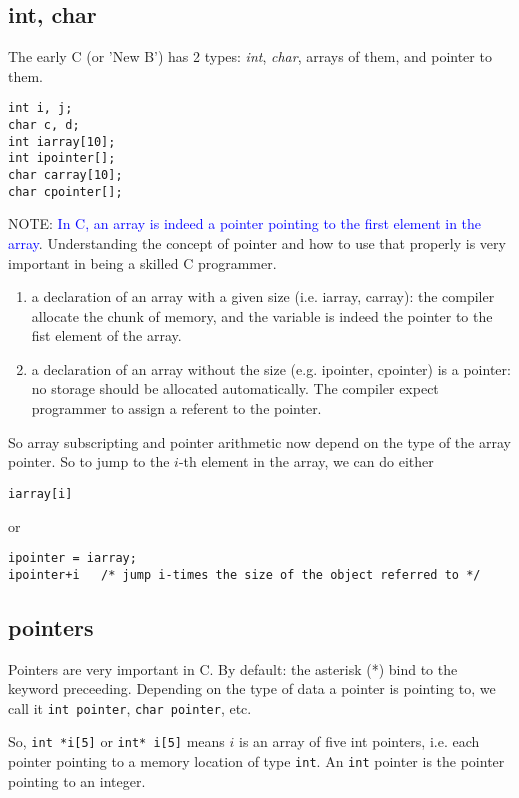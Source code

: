 \subsection{int, char}

The early C (or 'New B') has 2 types: {\it int}, {\it char}, arrays of them, and
pointer to them.
\begin{lstlisting}
int i, j;
char c, d;
int iarray[10];
int ipointer[];
char carray[10];
char cpointer[];
\end{lstlisting}
NOTE: \textcolor{blue}{In C, an array is indeed a pointer pointing to the first
element in the array}. Understanding the concept of pointer and how to use that
properly is very important in being a skilled C programmer.

\begin{enumerate}
  \item a declaration of an array with a given size (i.e. iarray, carray): the
  compiler allocate the chunk of memory, and the variable is indeed the pointer to the fist element of
  the array.
  \item a declaration of an array without the size (e.g. ipointer, cpointer) is
  a pointer: no storage should be allocated automatically. The compiler expect
  programmer to assign a referent to the pointer.
\end{enumerate}
So array subscripting and pointer arithmetic now depend on the type of the array
pointer. So to jump to the $i$-th element in the array, we can do either
\begin{lstlisting}
iarray[i]
\end{lstlisting}
or
\begin{lstlisting}
ipointer = iarray;
ipointer+i   /* jump i-times the size of the object referred to */
\end{lstlisting}


\subsection{pointers}
\label{sec:c_pointer}

Pointers are very important in C. By default: the asterisk (*) bind to the
keyword preceeding. Depending on the type of data a pointer is pointing to, we
call it \verb!int pointer!, \verb!char pointer!, etc.


So, \verb!int *i[5]! or \verb!int* i[5]! means $i$ is an array of five
int pointers, i.e. each pointer pointing to a memory location of type
\verb!int!.  An \verb!int! pointer is the pointer pointing to an integer.

